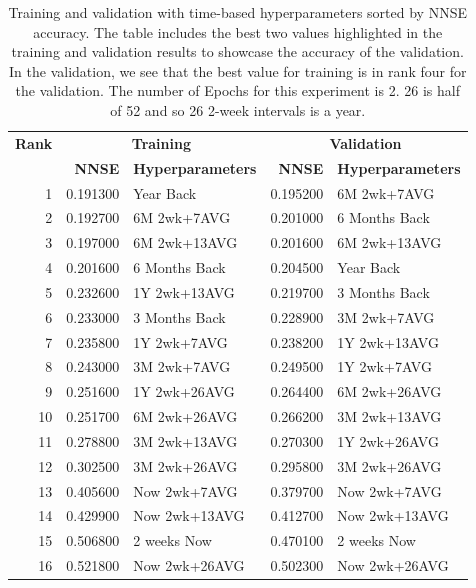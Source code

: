 \documentclass[utf8]{FrontiersinVancouver} %
\begin{document}
\begin{table}[p]

  \caption{Training and validation with time-based hyperparameters
    sorted by NNSE accuracy. The table includes the best two
    values highlighted in the training and validation results to
    showcase the accuracy of the validation. In the validation,
    we see that the best value for training is in rank four for the
    validation. The number of Epochs for this experiment is 2.
    26 is half of 52 and so 26 2-week intervals is a year.}
  \label{tab:training-2}

  \renewcommand{\arraystretch}{1.2}
  \begin{center}
    {\footnotesize
\begin{tabular}{|r|rl||rl|}
  \hline
{\bf Rank} & \multicolumn{2}{c||}{\bfseries Training} & \multicolumn{2}{c|}{\bfseries Validation}  \\
     &   {\bf NNSE} & {\bf Hyperparameters} & {\bf NNSE} & {\bf Hyperparameters} \\
\hline
1 & \color{red} 0.191300 & \color{red} Year Back & \color{blue} 0.195200 & \color{blue} 6M 2wk+7AVG \\
2 & 0.192700 & \color{blue} 6M 2wk+7AVG & \color{teal} 0.201000 & \color{teal} 6 Months Back \\
3 & 0.197000 & 6M 2wk+13AVG & 0.201600 & 6M 2wk+13AVG \\
4 & \color{teal} 0.201600 & \color{teal} 6 Months Back & \color{red} 0.204500 & \color{red} Year Back \\
5 & 0.232600 & 1Y 2wk+13AVG & 0.219700 & 3 Months Back \\
6 & 0.233000 & 3 Months Back & 0.228900 & 3M 2wk+7AVG \\
7 & 0.235800 & 1Y 2wk+7AVG & 0.238200 & 1Y 2wk+13AVG \\
8 & 0.243000 & 3M 2wk+7AVG & 0.249500 & 1Y 2wk+7AVG \\
9 & 0.251600 & 1Y 2wk+26AVG & 0.264400 & 6M 2wk+26AVG \\
10 & 0.251700 & 6M 2wk+26AVG & 0.266200 & 3M 2wk+13AVG \\
11 & 0.278800 & 3M 2wk+13AVG & 0.270300 & 1Y 2wk+26AVG \\
12 & 0.302500 & 3M 2wk+26AVG & 0.295800 & 3M 2wk+26AVG \\
13 & 0.405600 & Now 2wk+7AVG & 0.379700 & Now 2wk+7AVG \\
14 & 0.429900 & Now 2wk+13AVG & 0.412700 & Now 2wk+13AVG \\
15 & 0.506800 & 2 weeks Now & 0.470100 & 2 weeks Now \\
16 & 0.521800 & Now 2wk+26AVG & 0.502300 & Now 2wk+26AVG \\
\hline
\end{tabular}
}
\end{center}


\end{table}
\end{document}
